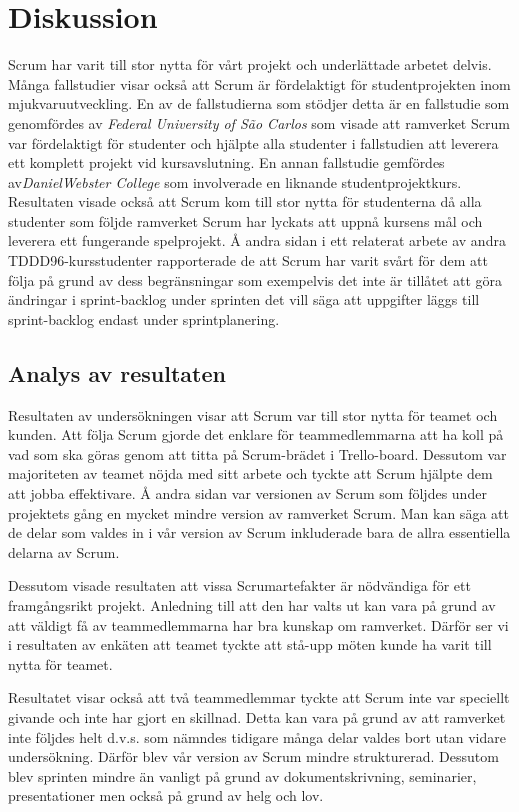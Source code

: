 
\section{Diskussion}
\label{sec:Lieth_Wahid-discussion}
Scrum har varit till stor nytta för vårt projekt och underlättade arbetet delvis. Många fallstudier visar också att Scrum är fördelaktigt för studentprojekten inom mjukvaruutveckling. En av de fallstudierna som stödjer detta är
en fallstudie som genomfördes av \textit{Federal University of São Carlos} som visade att ramverket Scrum var fördelaktigt för studenter och hjälpte alla studenter i fallstudien att leverera ett komplett projekt vid kursavslutning. En annan fallstudie gemfördes av\textit{DanielWebster College} som involverade en liknande studentprojektkurs.~\cite{GameDesign} Resultaten visade också att Scrum kom till stor nytta för studenterna då alla studenter som följde ramverket Scrum har lyckats att uppnå kursens mål och leverera ett fungerande spelprojekt. Å andra sidan i ett relaterat arbete av andra TDDD96-kursstudenter rapporterade de att Scrum har varit svårt för dem att följa på grund av dess begränsningar som exempelvis det inte är tillåtet att göra ändringar i sprint-backlog under sprinten det vill säga att uppgifter läggs till sprint-backlog endast under sprintplanering.~\cite{overvakn73:online}


\subsection{Analys av resultaten}
Resultaten av undersökningen visar att Scrum var till stor nytta för teamet och kunden. Att följa Scrum gjorde det enklare för teammedlemmarna att ha koll på vad som ska göras genom att titta på Scrum-brädet i Trello-board. Dessutom var majoriteten av teamet nöjda med sitt arbete och tyckte att Scrum hjälpte dem att jobba effektivare. Å andra sidan var versionen av Scrum som följdes under projektets gång en mycket mindre version av ramverket Scrum. Man kan säga att de delar som valdes in i vår version av Scrum inkluderade bara de allra essentiella delarna av Scrum.

Dessutom visade resultaten att vissa Scrumartefakter är nödvändiga för ett framgångsrikt projekt. Anledning till att den har valts ut kan vara på grund av att väldigt få av teammedlemmarna har bra kunskap om ramverket. Därför ser vi i resultaten av enkäten att teamet tyckte att stå-upp möten kunde ha varit till nytta för teamet. 

Resultatet visar också  att två teammedlemmar tyckte att Scrum inte var speciellt givande och inte har gjort en skillnad. Detta kan vara på grund av att ramverket inte följdes helt d.v.s. som nämndes tidigare många delar valdes bort utan vidare undersökning. Därför blev vår version av Scrum mindre strukturerad. Dessutom blev sprinten mindre än vanligt på grund av dokumentskrivning, seminarier, presentationer men också på grund av helg och lov.
